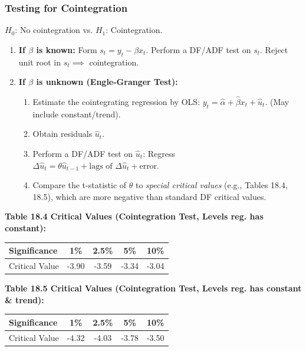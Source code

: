 \documentclass[a4paper, 10pt]{article}
\theoremstyle{definition}	%
\begin{document}
\subsubsection{Testing for Cointegration}
\(H_0\): No cointegration vs. \(H_1\): Cointegration.
\begin{enumerate}
    \item \textbf{If \(\beta\) is known:} Form \(s_t = y_t - \beta x_t\). Perform a DF/ADF test on \(s_t\). Reject unit root in \(s_t \implies\) cointegration.
    \item \textbf{If \(\beta\) is unknown (Engle-Granger Test):}
    \begin{enumerate}
        \item Estimate the cointegrating regression by OLS: \(y_t = \hat{\alpha} + \hat{\beta} x_t + \hat{u}_t\). (May include constant/trend).
        \item Obtain residuals \(\hat{u}_t\).
        \item Perform a DF/ADF test on \(\hat{u}_t\): Regress \(\Delta \hat{u}_t = \theta \hat{u}_{t-1} + \text{lags of } \Delta \hat{u}_t + \text{error}\).
        \item Compare the t-statistic of \(\hat{\theta}\) to \textit{special critical values} (e.g., Tables 18.4, 18.5), which are more negative than standard DF critical values.
    \end{enumerate}
\end{enumerate}
\textbf{Table 18.4 Critical Values (Cointegration Test, Levels reg. has constant):}
\begin{center}
\begin{tabular}{|l|c|c|c|c|} \hline Significance & 1\% & 2.5\% & 5\% & 10\% \\ \hline Critical Value & -3.90 & -3.59 & -3.34 & -3.04 \\ \hline \end{tabular}
\end{center}
\textbf{Table 18.5 Critical Values (Cointegration Test, Levels reg. has constant \& trend):}
\begin{center}
\begin{tabular}{|l|c|c|c|c|} \hline Significance & 1\% & 2.5\% & 5\% & 10\% \\ \hline Critical Value & -4.32 & -4.03 & -3.78 & -3.50 \\ \hline \end{tabular}
\end{center}
\end{document}
